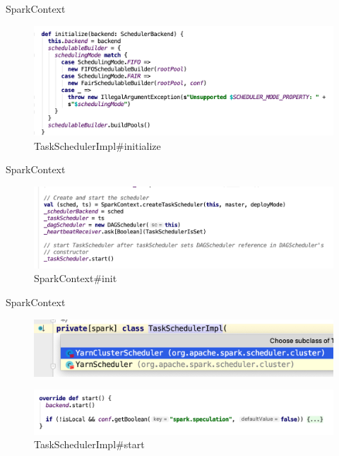 \begin{frame}[plain,t]{SparkContext} %
	 \\  \vspace{2ex}
	\begin{figure}
		\centering
		\includegraphics[width=0.9\linewidth]{images/init006}
		\caption{TaskSchedulerImpl\#initialize}
		\label{fig:init006}
	\end{figure}
	
\end{frame}
\begin{frame}[plain,t]{SparkContext} %
	 \\  \vspace{2ex}
	\begin{figure}
		\centering
		\includegraphics[width=0.9\linewidth]{images/init002}
		\caption{SparkContext\#init}
		\label{fig:init002}
	\end{figure}
	
\end{frame}
\begin{frame}[plain,t]{SparkContext} %
	 \\  \vspace{2ex}
	\begin{figure}
		\centering
		\includegraphics[width=0.9\linewidth]{images/init009}
		\label{fig:init009}
	\end{figure}
\begin{figure}
	\centering
	\includegraphics[width=0.9\linewidth]{images/init010}
	\caption{TaskSchedulerImpl\#start}
	\label{fig:init010}
\end{figure}

	
\end{frame}
